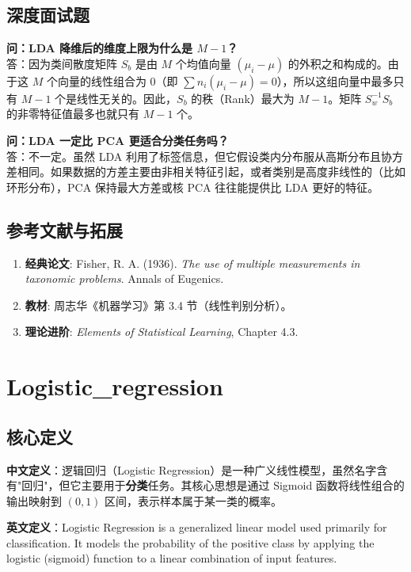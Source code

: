 \documentclass[12pt, a4paper]{book}
\begin{document}
\section{深度面试题}

\textbf{问：LDA 降维后的维度上限为什么是 $M-1$？}\\
答：因为类间散度矩阵 $S_b$ 是由 $M$ 个均值向量 $(\mu_i - \mu)$ 的外积之和构成的。由于这 $M$ 个向量的线性组合为 0（即 $\sum n_i(\mu_i - \mu) = 0$），所以这组向量中最多只有 $M-1$ 个是线性无关的。因此，$S_b$ 的秩（Rank）最大为 $M-1$。矩阵 $S_w^{-1} S_b$ 的非零特征值最多也就只有 $M-1$ 个。

\textbf{问：LDA 一定比 PCA 更适合分类任务吗？}\\
答：不一定。虽然 LDA 利用了标签信息，但它假设类内分布服从高斯分布且协方差相同。如果数据的方差主要由非相关特征引起，或者类别是高度非线性的（比如环形分布），PCA 保持最大方差或核 PCA 往往能提供比 LDA 更好的特征。

\section{参考文献与拓展}
\begin{enumerate}
    \item \textbf{经典论文}: Fisher, R. A. (1936). \textit{The use of multiple measurements in taxonomic problems}. Annals of Eugenics.
    \item \textbf{教材}: 周志华《机器学习》第 3.4 节（线性判别分析）。
    \item \textbf{理论进阶}: \textit{Elements of Statistical Learning}, Chapter 4.3.
\end{enumerate}

\chapter{Logistic\_regression}


\section{核心定义}
\textbf{中文定义}：逻辑回归（Logistic Regression）是一种广义线性模型，虽然名字含有"回归"，但它主要用于\textbf{分类}任务。其核心思想是通过 Sigmoid 函数将线性组合的输出映射到 $(0, 1)$ 区间，表示样本属于某一类的概率。

\textbf{英文定义}：Logistic Regression is a generalized linear model used primarily for classification. It models the probability of the positive class by applying the logistic (sigmoid) function to a linear combination of input features.
\end{document}
